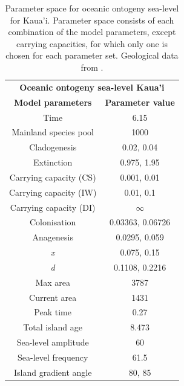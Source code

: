 \begin{table}[ht]
    \centering
    \caption{Parameter space for oceanic ontogeny sea-level for Kaua'i. Parameter space consists of each combination of the model parameters, except carrying capacities, for which only one is chosen for each parameter set. Geological data from \cite{lim_true_2017}.}
    \begin{tabular}{ c | c }
        \multicolumn{2}{c}{\textbf{Oceanic ontogeny sea-level Kaua'i}} \\
        \textbf{Model parameters} & \textbf{Parameter value} \\ 
        \hline
        \hline
        Time & 6.15 \\
        \hline
        Mainland species pool & 1000 \\
        \hline
        Cladogenesis & 0.02, 0.04 \\
        \hline
        Extinction & 0.975, 1.95 \\
        \hline
        Carrying capacity (CS) & 0.001, 0.01 \\
        \hline
        Carrying capacity (IW) & 0.01, 0.1 \\
        \hline
        Carrying capacity (DI) & $\infty$ \\
        \hline
        Colonisation & 0.03363, 0.06726 \\
        \hline
        Anagenesis & 0.0295, 0.059 \\
        \hline
        \textit{x} & 0.075, 0.15 \\
        \hline
        \textit{d} & 0.1108, 0.2216 \\
        \hline
        Max area & 3787 \\
        \hline
        Current area & 1431 \\
        \hline
        Peak time & 0.27 \\
        \hline
        Total island age & 8.473 \\
        \hline
        Sea-level amplitude & 60 \\
        \hline
        Sea-level frequency & 61.5 \\
        \hline
        Island gradient angle & 80, 85 \\
    \end{tabular}
    \label{tab:oceanic_ontogeny_sea_level_old}
\end{table}

